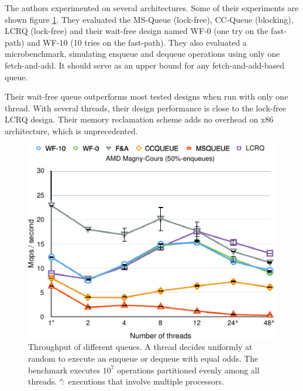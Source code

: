 


The authors experimented on several architectures. Some of their experiments are
shown figure \ref{fig:courbe}. They evaluated the MS-Queue (lock-free), CC-Queue
(blocking), LCRQ (lock-free) and their wait-free design named WF-0 (one try on
the fast-path) and WF-10 (10 tries on the fast-path). They also evaluated a
microbenchmark, simulating enqueue and dequeue operations using only one
fetch-and-add. It should serve as an upper bound for any fetch-and-add-based
queue.

Their wait-free queue outperforms most tested designs when run with only one
thread. With several threads, their design performance is close to the lock-free
LCRQ design. Their memory reclamation scheme adds no overhead on x86
architecture, which is unprecedented.

\begin{figure}
  \caption{ Throughput of different queues. A thread decides uniformly at random
    to execute an enqueue or dequeue with equal odds. The benchmark executes
    $10^7$ operations partitioned evenly among all threads. \char`\^:~executions
    that involve multiple processors. \cite{Yang:2016:WQF:3016078.2851168}}
    \label{fig:courbe}
    \center
    \includegraphics[width=1\linewidth]{img/courbe.pdf}
\end{figure}

